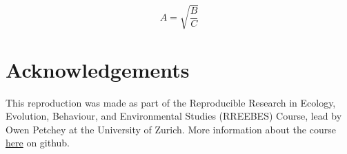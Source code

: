 \documentclass[10pt,a4paper,onecolumn]{article}
\begin{document}
\begin{equation} A = \sqrt{\frac{B}{C}} \label{eq:1}\end{equation}

\section{Acknowledgements}\label{acknowledgements}

This reproduction was made as part of the Reproducible Research in
Ecology, Evolution, Behaviour, and Environmental Studies (RREEBES)
Course, lead by Owen Petchey at the University of Zurich. More
information about the course
\href{https://github.com/opetchey/RREEBES/blob/master/README.md}{here}
on github.

{\sffamily \small
  \printbibliography[title=References]
}
\end{document}
